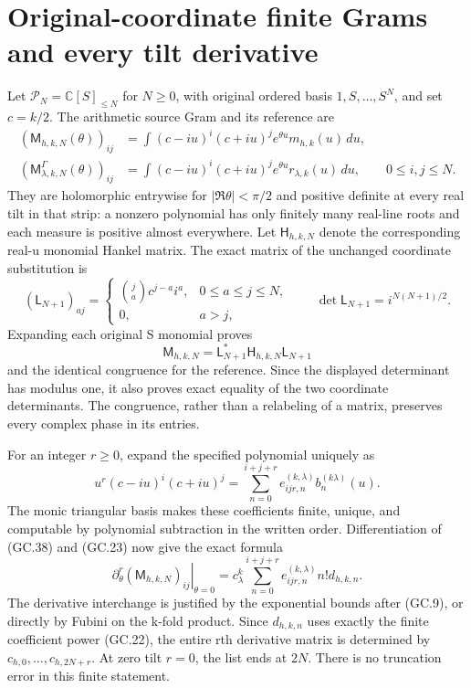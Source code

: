 \documentclass[11pt]{article}
\begin{document}
\section{Original-coordinate finite Grams and every tilt derivative}

Let $\mathcal P_N=\mathbb C[S]_{\le N}$ for $N\ge0$, with original
ordered basis $1,S,\ldots,S^N$, and set $c=k/2$. The arithmetic
source Gram and its reference are
\[
 \begin{split}
 (\mathsf M_{h,k,N}(\theta))_{ij}
   &=\int(c-iu)^i(c+iu)^j e^{\theta u}m_{h,k}(u)\,du,\\
 (\mathsf M_{\lambda,k,N}^\Gamma(\theta))_{ij}
   &=\int(c-iu)^i(c+iu)^j e^{\theta u}r_{\lambda,k}(u)\,du,
 \qquad 0\le i,j\le N. 
 \end{split}                                                   \tag{GC.38}
\]
They are holomorphic entrywise for $|\Re\theta|<\pi/2$ and
positive definite at every real tilt in that strip: a nonzero
polynomial has only finitely many real-line roots and each measure
is positive almost everywhere. Let $\mathsf H_{h,k,N}$ denote
the corresponding real-u monomial Hankel matrix. The exact matrix
of the unchanged coordinate substitution is
\[
 (\mathsf L_{N+1})_{aj}=
 \begin{cases}\binom ja c^{j-a}i^a,&0\le a\le j\le N,\\
 0,&a>j,
 \end{cases}\qquad
 \det\mathsf L_{N+1}=i^{N(N+1)/2}.                            \tag{GC.39}
\]
Expanding each original S monomial proves
\[
 \mathsf M_{h,k,N}=\mathsf L_{N+1}^*\mathsf H_{h,k,N}
                                     \mathsf L_{N+1}            \tag{GC.40}
\]
and the identical congruence for the reference. Since the displayed
determinant has modulus one, it also proves exact equality of the
two coordinate determinants. The congruence, rather than a relabeling
of a matrix, preserves every complex phase in its entries.

For an integer $r\ge0$, expand the specified polynomial uniquely as
\[
 u^r(c-iu)^i(c+iu)^j
 =\sum_{n=0}^{i+j+r}e_{ijr,n}^{(k,\lambda)}b_n^{(k\lambda)}(u).
                                                               \tag{GC.41}
\]
The monic triangular basis makes these coefficients finite, unique,
and computable by polynomial subtraction in the written order.
Differentiation of (GC.38) and (GC.23) now give the exact formula
\[
 \boxed{\left.\partial_\theta^r
      (\mathsf M_{h,k,N})_{ij}\right|_{\theta=0}
 =c_\lambda^k\sum_{n=0}^{i+j+r}
                 e_{ijr,n}^{(k,\lambda)}n!d_{h,k,n}.}           \tag{GC.42}
\]
The derivative interchange is justified by the exponential bounds
after (GC.9), or directly by Fubini on the k-fold product. Since
$d_{h,k,n}$ uses exactly the finite coefficient power (GC.22), the
entire rth derivative matrix is determined by
$c_{h,0},\ldots,c_{h,2N+r}$. At zero tilt $r=0$, the list ends at
$2N$. There is no truncation error in this finite statement.
\end{document}
